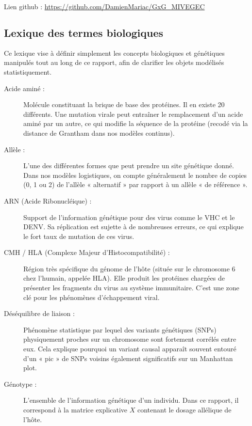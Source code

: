 \documentclass[11pt,a4paper]{article}
\begin{document}
Lien github :  \url{https://github.com/DamienMariac/GxG_MIVEGEC}



\newpage
\subsection{Lexique des termes biologiques}

Ce lexique vise à définir simplement les concepts biologiques et génétiques manipulés tout au long de ce rapport, afin de clarifier les objets modélisés statistiquement.

\begin{description}

    \item[Acide aminé :] Molécule constituant la brique de base des protéines. Il en existe 20 différents. Une mutation virale peut entraîner le remplacement d'un acide aminé par un autre, ce qui modifie la séquence de la protéine (recodé via la distance de Grantham dans nos modèles continus).
    
    \item[Allèle :] L'une des différentes formes que peut prendre un site génétique donné. Dans nos modèles logistiques, on compte généralement le nombre de copies (0, 1 ou 2) de l'allèle « alternatif » par rapport à un allèle « de référence ».
    
    \item[ARN (Acide Ribonucléique) :] Support de l'information génétique pour des virus comme le VHC et le DENV. Sa réplication est sujette à de nombreuses erreurs, ce qui explique le fort taux de mutation de ces virus.
    
    \item[CMH / HLA (Complexe Majeur d'Histocompatibilité) :] Région très spécifique du génome de l'hôte (située sur le chromosome 6 chez l'humain, appelée HLA). Elle produit les protéines chargées de présenter les fragments du virus au système immunitaire. C'est une zone clé pour les phénomènes d'échappement viral.
    
    \item[Déséquilibre de liaison :] Phénomène statistique par lequel des variants génétiques (SNPs) physiquement proches sur un chromosome sont fortement corrélés entre eux. Cela explique pourquoi un variant causal apparaît souvent entouré d'un « pic » de SNPs voisins également significatifs sur un Manhattan plot.
    
    \item[Génotype :] L'ensemble de l'information génétique d'un individu. Dans ce rapport, il correspond à la matrice explicative $X$ contenant le dosage allélique de l'hôte.
    

\end{description}
\end{document}
